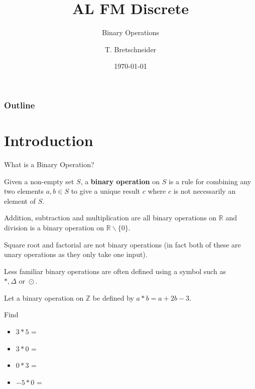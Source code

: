 \documentclass[8pt]{beamer}
\title[Discrete]{AL FM Discrete}
\subtitle{Binary Operations}
\author[]{T. Bretschneider}
\date[\today]{\today}
\newcommand{\sol}[2][+]{
\tikz[baseline]{\node[color=aa,fill=cc,rectangle,draw,anchor=base] {\onslide<#1->{#2}};}
}
\begin{document}
\frame{\titlepage}

\begin{frame}
\frametitle{Outline}
\tableofcontents

\end{frame}

\section{Introduction}

\begin{frame}{What is a Binary Operation?}
	\begin{definition}
	  Given a non-empty set $S$, a \textbf{binary operation} on $S$ is a rule for combining any two elements $a,b\in S$ to give a unique result  $c$ where  $c$ is not necessarily an element of  $S$.	
	\end{definition}

	Addition, subtraction and multiplication are all binary operations on $\mathbb{R}$ and division is a binary operation on $\mathbb{R} \backslash \{0\}$.

	Square root and factorial are not binary operations (in fact both of these are unary operations as they only take one input).

	Less familiar binary operations are often defined using a symbol such as  $*,\Delta \text{ or }\odot$.

	\begin{problem}
		Let a binary operation on $\mathbb{Z}$ be defined by $ a* b = a+2b-3$.

		Find 
		\begin{itemize}
			\item $3*5$ = \sol{10}
			\item  $3*0$ = \sol{0}
			\item  $0*3$ = \sol{3}
			\item  $-5*0$ = \sol{-8}
		\end{itemize}
	\end{problem}


\end{frame}
\end{document}

